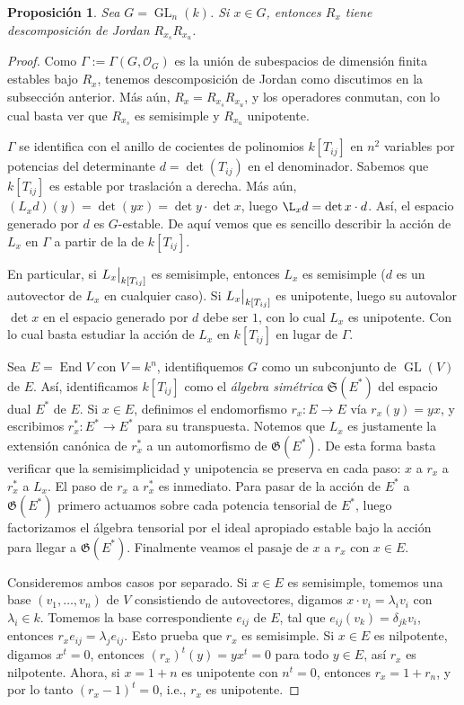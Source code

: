 \documentclass[spanish,10pt]{amsart}
\newtheorem{proposition}[theorem]{Proposición}
\theoremstyle{definition}
\theoremstyle{remark}
\numberwithin{equation}{section}
\newcommand\rest[2]{{%
  \left.\kern-\nulldelimiterspace %
  #1 %
  \vphantom{\big|} %
  \right|_{#2} %
  }}
\renewcommand{\O}{\mathcal{O}}
\begin{document}
\begin{proposition}
Sea $G = \operatorname{GL}_n (k)$. Si $x \in G$, entonces $R_x$ tiene descomposición de Jordan $R_{x_s} R_{x_u}$.
\end{proposition}

\begin{proof}
Como $\Gamma := \Gamma (G, \O_G)$ es la unión de subespacios de dimensión finita estables bajo $R_x$, tenemos descomposición de Jordan como discutimos en la subsección anterior. Más aún, $R_x = R_{x_s} R_{x_u}$, y los operadores conmutan, con lo cual basta ver que $R_{x_s}$ es semisimple y $R_{x_u}$ unipotente.

$\Gamma$ se identifica con el anillo de cocientes de polinomios $k[T_{ij}]$ en $n^2$ variables por potencias del determinante $d = \det (T_{ij})$ en el denominador. Sabemos que $k[T_{ij}]$ es estable por traslación a derecha. Más aún, $(L_x d) (y) = \det (y x) = \det y \cdot \det x$, luego $\L_x d = \det x \cdot d$. Así, el espacio generado por $d$ es $G$-estable. De aquí vemos que es sencillo describir la acción de $L_x$ en $\Gamma$ a partir de la de $k[T_{ij}]$.

En particular, si $\rest{L_x}{k[T_{ij}]}$ es semisimple, entonces $L_x$ es semisimple ($d$ es un autovector de $L_x$ en cualquier caso). Si $\rest{L_x}{k[T_{ij}]}$ es unipotente, luego su autovalor $\det x$ en el espacio generado por $d$ debe ser $1$, con lo cual $L_x$ es unipotente. Con lo cual basta estudiar la acción de $L_x$ en $k[T_{ij}]$ en lugar de $\Gamma$.

Sea $E = \operatorname{End} V$ con $V = k^n$, identifiquemos $G$ como un subconjunto de $\operatorname{GL}(V)$ de $E$. Así, identificamos $k[T_{ij}]$ como el \textit{álgebra simétrica} $\mathfrak S (E^*)$ del espacio dual $E^*$ de $E$. Si $x \in E$, definimos el endomorfismo $r_x : E \to E$ vía $r_{x} (y) = y x$, y escribimos $r_x^* : E^* \to E^*$ para su transpuesta. Notemos que $L_x$ es justamente la extensión canónica de $r_x^*$ a un automorfismo de $\mathfrak G (E^*)$. De esta forma basta verificar que la semisimplicidad y unipotencia se preserva en cada paso: $x$ a $r_x$ a $r_x^*$ a $L_x$. El paso de $r_x$ a $r_x^*$ es inmediato. Para pasar de la acción de $E^*$ a $\mathfrak G (E^*)$ primero actuamos sobre cada potencia tensorial de $E^*$, luego factorizamos el álgebra tensorial por el ideal apropiado estable bajo la acción para llegar a $\mathfrak G (E^*)$. Finalmente veamos el pasaje de $x$ a $r_x$ con $x \in E$.

Consideremos ambos casos por separado. Si $ x\in E$ es semisimple, tomemos una base $(v_1, \ldots, v_n)$ de $V$ consistiendo de autovectores, digamos $x \cdot v_i = \lambda_i v_i$ con $\lambda_i \in k$. Tomemos la base correspondiente $e_{ij}$ de $E$, tal que $e_{ij} (v_k) = \delta_{jk} v_i$, entonces $r_x e_{ij} = \lambda_j e_{ij}$. Esto prueba que $r_x$ es semisimple. Si $x \in E$ es nilpotente, digamos $x^t = 0$, entonces $(r_x)^t (y) = y x^t = 0$ para todo $y \in E$, así $r_x$ es nilpotente. Ahora, si $x = 1 + n$ es unipotente con $n^t = 0$, entonces $r_x = 1 + r_n$, y por lo tanto $(r_x - 1)^t = 0$, i.e., $r_x $ es unipotente.
\end{proof}
\end{document}
